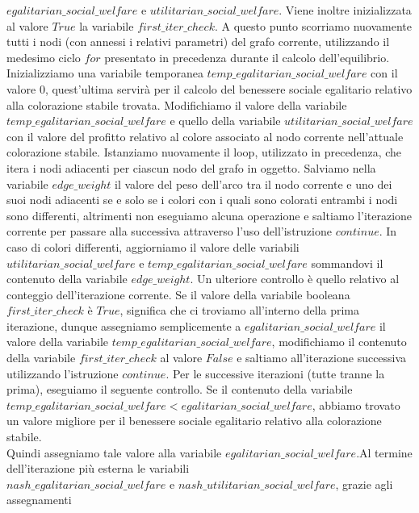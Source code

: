 $egalitarian\_social\_welfare$ e $utilitarian\_social\_welfare$. Viene inoltre inizializzata al valore $True$ la variabile $first\_iter\_check$. A questo punto scorriamo nuovamente tutti i nodi (con annessi i relativi parametri) del grafo corrente, utilizzando il medesimo ciclo $for$ presentato in precedenza durante il calcolo dell'equilibrio. Inizializziamo una variabile temporanea $temp\_egalitarian\_social\_welfare$ con il valore $0$, quest'ultima servirà per il calcolo del benessere sociale egalitario relativo alla colorazione stabile trovata. Modifichiamo il valore della variabile $temp\_egalitarian\_social\_welfare$ e quello della variabile $utilitarian\_social\_welfare$ con il valore del profitto relativo al colore associato al nodo corrente nell'attuale colorazione stabile. Istanziamo nuovamente il loop, utilizzato in precedenza, che itera i nodi adiacenti per ciascun nodo del grafo in oggetto. Salviamo nella variabile $edge\_weight$ il valore del peso dell'arco tra il nodo corrente e uno dei suoi nodi adiacenti se e solo se i colori con i quali sono colorati entrambi i nodi sono differenti, altrimenti non eseguiamo alcuna operazione e saltiamo l'iterazione corrente per passare alla successiva attraverso l'uso dell'istruzione $continue$. In caso di colori differenti, aggiorniamo il valore delle variabili $utilitarian\_social\_welfare$ e $temp\_egalitarian\_social\_welfare$ sommandovi il contenuto della variabile $edge\_weight$. Un ulteriore controllo è quello relativo al conteggio dell'iterazione corrente. Se il valore della variabile booleana $first\_iter\_check$ è $True$, significa che ci troviamo all'interno della prima iterazione, dunque assegniamo semplicemente a $egalitarian\_social\_welfare$ il valore della variabile $temp\_egalitarian\_social\_welfare$, modifichiamo il contenuto della variabile $first\_iter\_check$ al valore $False$ e saltiamo all'iterazione successiva utilizzando l'istruzione $continue$. Per le successive iterazioni (tutte tranne la prima), eseguiamo il seguente controllo. Se il contenuto della variabile \\
$temp\_egalitarian\_social\_welfare < egalitarian\_social\_welfare$, abbiamo trovato un valore migliore per il benessere sociale egalitario relativo alla colorazione stabile.\\
Quindi assegniamo tale valore alla variabile $egalitarian\_social\_welfare$.Al termine dell'iterazione più esterna le variabili \\
$nash\_egalitarian\_social\_welfare$ e $nash\_utilitarian\_social\_welfare$, grazie agli assegnamenti \\
